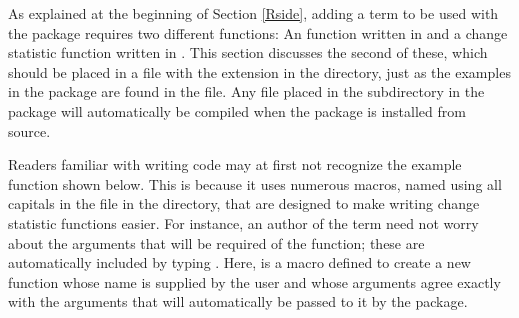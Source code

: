 \documentclass[article]{jss}
\begin{document}
As explained at the beginning of Section \ref{Rside}, adding a term to be
used with the  package requires two different functions:  An 
 function written in  and a
change statistic function written in .  This section discusses the
second of these, which should be placed in a file with the extension  
in the  directory, just as the examples in the 
 package are found in the 
file.
Any  file placed in the  subdirectory in the 
 package will
automatically be compiled when the package is installed from source.

Readers familiar with writing  code may at first not recognize 
the example  function shown below.  This is because it
uses numerous macros, named using all capitals
in the  file in the
 directory, that are designed to make writing change statistic
functions easier.
For instance, an author of the  term need not worry about 
the arguments that will be required of the  function; these
are automatically included by typing 
.  Here,  is a macro
defined to create a new function whose name is supplied by the user and 
whose arguments agree exactly with the arguments that will automatically be passed to 
it by the  package.
\end{document}
